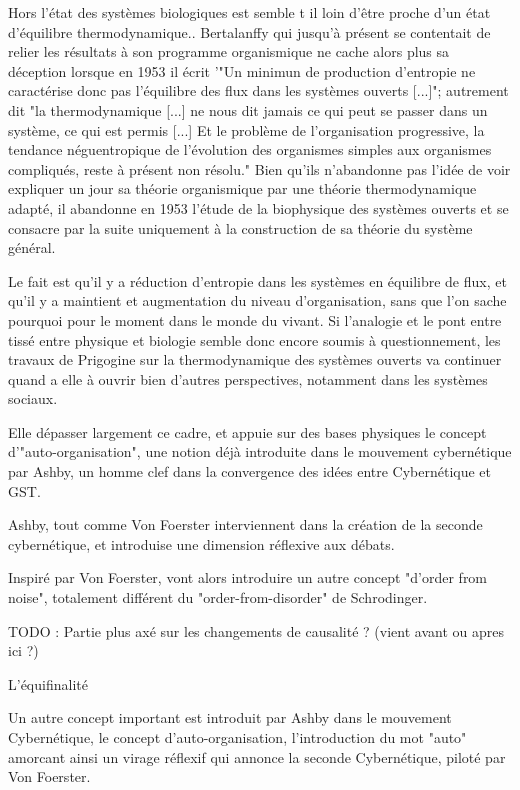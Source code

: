 {Hors l'état des systèmes biologiques est semble t il loin d'être proche d'un état d'équilibre thermodynamique.. Bertalanffy qui jusqu'à présent se contentait de relier les résultats à son programme organismique ne cache alors plus sa déception lorsque en 1953 il écrit '"Un minimun de production d'entropie ne caractérise donc pas l'équilibre des flux dans les systèmes ouverts [...]"; autrement dit "la thermodynamique [...] ne nous dit jamais ce qui peut se passer dans un système, ce qui est permis [...] Et le problème de l'organisation progressive, la tendance néguentropique de l'évolution des organismes simples aux organismes compliqués, reste à présent non résolu." Bien qu'ils n'abandonne pas l'idée de voir expliquer un jour sa théorie organismique par une théorie thermodynamique adapté, il abandonne en 1953 l'étude de la biophysique des systèmes ouverts et se consacre par la suite uniquement à la construction de sa théorie du système général.

Le fait est qu'il y a réduction d'entropie dans les systèmes en équilibre de flux, et qu'il y a maintient et augmentation du niveau d'organisation, sans que l'on sache pourquoi pour le moment dans le monde du vivant. Si l'analogie et le pont entre tissé entre physique et biologie semble donc encore soumis à questionnement, les travaux de Prigogine sur la thermodynamique des systèmes ouverts va continuer quand a elle à ouvrir bien d'autres perspectives, notamment dans les systèmes sociaux. 

Elle dépasser largement ce cadre, et appuie sur des bases physiques le concept d'"auto-organisation", une notion déjà introduite dans le mouvement cybernétique par Ashby, un homme clef dans la convergence des idées entre Cybernétique et GST.

Ashby, tout comme Von Foerster interviennent dans la création de la seconde cybernétique, et introduise une dimension réflexive aux débats.

Inspiré par Von Foerster, vont alors introduire un autre concept "d'order from noise", totalement différent du "order-from-disorder" de Schrodinger.

TODO : Partie plus axé sur les changements de causalité ? (vient avant ou apres ici ?)

L'équifinalité 

Un autre concept important est introduit par Ashby dans le mouvement Cybernétique, le concept d'auto-organisation, l'introduction du mot "auto" amorcant ainsi un virage réflexif qui annonce la seconde Cybernétique, piloté par Von Foerster.


}
